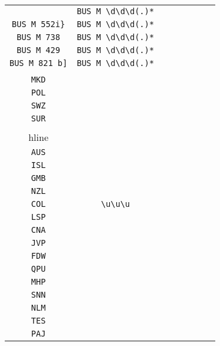 \begin{longtable}{cccccccc}
\begin{tabular}{ll}
    \verb|BUS M 462ES| & \verb|BUS M \d\d\d(.)*|\\
\verb|BUS M 552i}| & \verb|BUS M \d\d\d(.)*|\\
\verb|BUS M 738| & \verb|BUS M \d\d\d(.)*|\\
\verb|BUS M 429| & \verb|BUS M \d\d\d(.)*|\\
\verb|BUS M 821	b]| & \verb|BUS M \d\d\d(.)*|
\end{tabular}
\\\midrule 
\begin{tabular}{l}
    \verb|NIC|\\
\verb|MKD|\\
\verb|POL|\\
\verb|SWZ|\\
\verb|SUR|\\
\\hline\\
\verb|AUS|\\
\verb|ISL|\\
\verb|GMB|\\
\verb|NZL|\\
\verb|COL|
\end{tabular}

&
\verb|\u\u\u|
&

\begin{tabular}{l}
    \verb|\u\u\u|\\
\verb|LSP|\\
\verb|CNA|\\
\verb|JVP|\\
\verb|FDW|\\
\verb|QPU|
\end{tabular}

&

\begin{tabular}{l}
    \verb|\u\u\u|\\
\verb|MHP|\\
\verb|SNN|\\
\verb|NLM|\\
\verb|TES|\\
\verb|PAJ|
\end{tabular}

&


\end{longtable}
